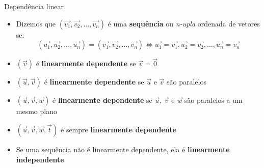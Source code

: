 \begin{frame}{Dependência linear}
    \begin{itemize}
        \item Dizemos que \((\vec{v_1}, \vec{v_2}, \ldots, \vec{v_n})\) é uma \textbf{sequência} ou \textit{n-upla}
            ordenada  de vetores se:
            \[
                (\vec{u_1}, \vec{u_2}, \ldots, \vec{u_n}) = (\vec{v_1}, \vec{v_2}, \ldots, \vec{v_n})
                \Longleftrightarrow \vec{u_1}=\vec{v_1}, \vec{u_2}=\vec{v_2}, \ldots, \vec{u_n}=\vec{v_n}
            \]
            \pause
        \item \((\vec{v})\) é \textbf{linearmente dependente} se \(\vec{v}=\vec{0}\)
        \item \((\vec{u}, \vec{v})\) é \textbf{linearmente dependente} se \(\vec{u}\) e \(\vec{v}\) são paralelos
        \item \((\vec{u}, \vec{v}, \vec{w})\) é  \textbf{linearmente dependente} se \(\vec{u}\), \(\vec{v}\) e \(\vec{w}\) são paralelos a um mesmo plano
        \item \((\vec{u}, \vec{v}, \vec{w}, \vec{t})\) é sempre \textbf{linearmente dependente}
            \pause
        \item Se uma sequência não é linearmente dependente, ela é \textbf{linearmente independente}
    \end{itemize}

\end{frame}

